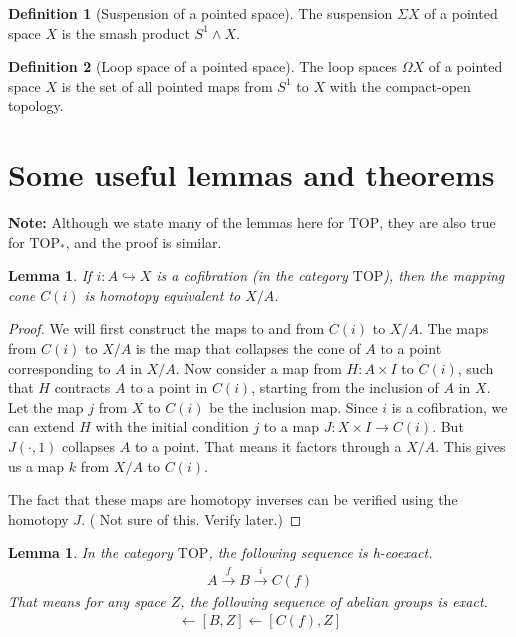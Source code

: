 \documentclass[12pt, notitlepage]{article}
\newtheorem{lem}[thm]{Lemma}
\theoremstyle{definition}
\newtheorem{defn}{Definition}[section]
\newcommand{\cat}[1]{\mathrm{#1}}
\begin{document}
\begin{defn}[Suspension of a pointed space]
  The suspension $\Sigma X$ of a pointed space $X$ is the smash product $S^1 \wedge X$.
\end{defn}

\begin{defn}[Loop space of a pointed space]
  The loop spaces $\Omega X$ of a pointed space $X$ is the set of all pointed maps from $S^1$ to $X$
  with the compact-open topology.
\end{defn}

\section{Some useful lemmas and theorems}
\label{sec:some-useful-lemmas}

\textbf{Note:} Although we state many of the lemmas here for $\cat{TOP}$, they are also true for
$\cat{TOP}_{\ast}$, and the proof is similar.

\begin{lem}
  If $i: A \hookrightarrow X$ is a cofibration (in the category $\cat{TOP}$), then the mapping cone
  $C(i)$ is homotopy equivalent to $X/A$.
\end{lem}

\begin{proof}
  We will first construct the maps to and from $C(i)$ to $X/A$. The maps from $C(i)$ to $X/A$ is the
  map that collapses the cone of $A$ to a point corresponding to $A$ in $X/A$. Now consider a map
  from $H: A \times I$ to $C(i)$, such that $H$ contracts $A$ to a point in $C(i)$, starting from
  the inclusion of $A$ in $X$. Let the map $j$ from $X$ to $C(i)$ be the inclusion map. Since $i$ is
  a cofibration, we can extend $H$ with the initial condition $j$ to a map $J: X \times I \to
  C(i)$. But $J(\cdot, 1)$ collapses $A$ to a point. That means it factors through a $X/A$. This
  gives us a map $k$ from $X/A$ to $C(i)$.

  The fact that these maps are homotopy inverses can be verified using the homotopy
  $J$. ({\color{red} Not sure of this. Verify later.})
\end{proof}

\begin{lem}
  In the category $\cat{TOP}$, the following sequence is h-coexact.
  \begin{align*}
    A \xrightarrow{f} B \xrightarrow{i} C(f)
  \end{align*}
  That means for any space $Z$, the following sequence of abelian groups is exact.
  \begin{align*}
    [A, Z] \leftarrow [B,Z] \leftarrow [C(f), Z]
  \end{align*}
\end{lem}
\end{document}
